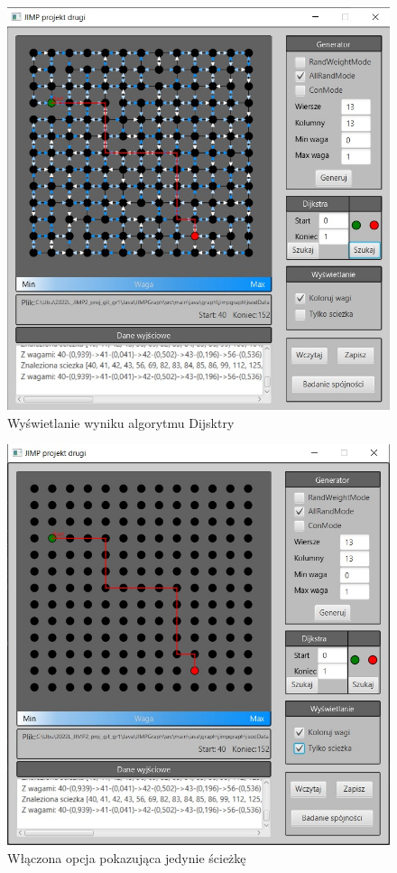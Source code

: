 \documentclass{article}
\begin{document}
 \begin{figure}[h]
\centering
\includegraphics[width=1\textwidth]{Screenshot_586.jpg}
\caption{\label{fig:mod}Wyświetlanie wyniku algorytmu Dijsktry}
\end{figure}
\pagebreak

\begin{figure}[h]
\centering
\includegraphics[width=1\textwidth]{Screenshot_587.jpg}
\caption{\label{fig:mod}Włączona opcja pokazująca jedynie ścieżkę}
\end{figure}
\pagebreak
\end{document}
